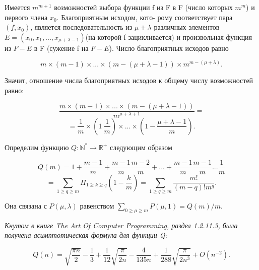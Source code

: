 \begin{myproof}
Имеется $m^{m+1}$ возможностей выбора функции f из F в F (число \linebreak которых $m^m$) и первого члена $x_{0}$. Благоприятным исходом, кото- \linebreak \indent рому соответствует пара $(f, x_{0})$, является последовательность из \linebreak \indent $\mu + \lambda$ различных элементов $E = (x_{0}, x_{1},..., x_{\mu + \lambda -1})$(на которой f \linebreak \indent зацикливается) и произвольная функция из $F - E$ в F (сужение f \linebreak \indent на $F - E$). Число благоприятных исходов равно \par 

$$m \times (m - 1) \times ... \times (m -(\mu + \lambda - 1)) \times m^{m - (\mu + \lambda)}.$$ \par 
Значит, отношение числа благоприятных исходов к общему числу возможностей равно: \par 

$$\frac{m \times (m - 1) \times ... \times (m - (\mu + \lambda - 1))}{m^{\mu + \lambda + 1}} =$$ $$= \frac{1}{m} \times (1 \ \frac{1}{m})\times ... \times (1 - \frac{\mu + \lambda - 1}{m}).$$ \par 
\end{myproof}
\begin{determ}
\slshape{Определим функцию $Q : \mathbb{N^{*}} \to \mathbb{R^{+}}$ следующим образом \par}

$$ Q(m) = 1 + \frac{m - 1}{m} + \frac{m - 1}{m}\frac{m - 2}{m} +...+\frac{m - 1}{m}\frac{m - 1}{m}...\frac{1}{m}$$ \linebreak
$$= \sum_{1 \geqslant q \geqslant m} \Pi_{1 \geqslant k \geqslant q}(1 - \frac{k}{m}) = \sum_{1 \geqslant q \geqslant m} \frac{m!}{(m - q)!m^{q}}.$$ \par 
\noindent Она связана с $P(\mu, \lambda)$ равенством $\sum_{0 \geqslant \mu \geqslant m}P(\mu,1) = Q(m)/m.$ \par 
\end{determ}
\begin{predl}
\slshape{Кнутом в книге The Art Of Computer Programming, раздел 1.2.11.3, была получена асимптотическая формула для функции Q:} \linebreak 

$$Q(n) = \sqrt{\frac{\pi n}{2}} - \frac{1}{3} + \frac{1}{12}\sqrt{\frac{\pi}{2n}} - \frac{4}{135n} + \frac{1}{288}\sqrt{\frac{\pi}{2n^{3}}} + O(n^{-2}).$$ \par 

 \linebreak
\end{predl}

